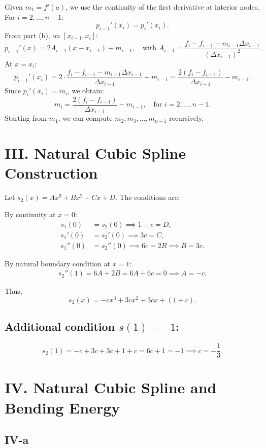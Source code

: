 \documentclass[a4paper]{article}
\begin{document}
Given \( m_1 = f'(a) \), we use the continuity of the first derivative at interior nodes. For \( i = 2, \dots, n-1 \):
\[
p_{i-1}'(x_i) = p_i'(x_i).
\]
From part (b), on \([x_{i-1}, x_i]\):
\[
p_{i-1}'(x) = 2A_{i-1}(x - x_{i-1}) + m_{i-1}, \quad \text{with } A_{i-1} = \frac{f_i - f_{i-1} - m_{i-1} \Delta x_{i-1}}{(\Delta x_{i-1})^2}.
\]
At \( x = x_i \):
\[
p_{i-1}'(x_i) = 2 \cdot \frac{f_i - f_{i-1} - m_{i-1} \Delta x_{i-1}}{\Delta x_{i-1}} + m_{i-1} = \frac{2(f_i - f_{i-1})}{\Delta x_{i-1}} - m_{i-1}.
\]
Since \( p_i'(x_i) = m_i \), we obtain:
\[
m_i = \frac{2(f_i - f_{i-1})}{\Delta x_{i-1}} - m_{i-1}, \quad \text{for } i = 2, \dots, n-1.
\]
Starting from \( m_1 \), we can compute \( m_2, m_3, \ldots, m_{n-1} \) recursively.


\section*{III. Natural Cubic Spline Construction}

Let \( s_2(x) = A x^3 + B x^2 + C x + D \). The conditions are:

By continuity at \( x = 0 \):
\begin{align}
s_1(0) &= s_2(0) \implies 1 + c = D, \\
s_1'(0) &= s_2'(0) \implies 3c = C, \\
s_1''(0) &= s_2''(0) \implies 6c = 2B \implies B = 3c.
\end{align}

By natural boundary condition at \( x = 1 \):
\begin{align}
s_2''(1) = 6A + 2B = 6A + 6c = 0 \implies A = -c.
\end{align}

Thus,
\[
s_2(x) = -c x^3 + 3c x^2 + 3c x + (1 + c).
\]

\subsection*{Additional condition \( s(1) = -1 \):}
\[
s_2(1) = -c + 3c + 3c + 1 + c = 6c + 1 = -1 \implies c = -\frac{1}{3}.
\]

\section*{IV. Natural Cubic Spline and Bending Energy}

\subsection*{IV-a}
\end{document}
